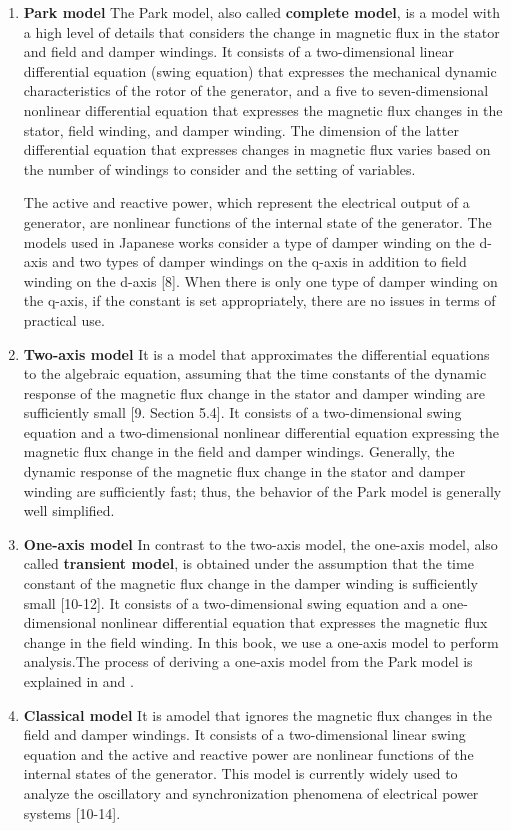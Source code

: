 \documentclass[graybox, envcountchap]{svmult}
\begin{document}
\smallskip
\begin{enumerate}[label=(\alph*)]
  \item \textbf{Park model} The Park model, also called \textbf{complete model},
  is a model with a high level of details that considers the change in magnetic
  flux in the stator and field and damper windings.  It consists of a
  two-dimensional linear differential equation (swing equation) that expresses
  the mechanical dynamic characteristics of the rotor of the generator, and a
  five to seven-dimensional nonlinear differential equation that expresses the
  magnetic flux changes in the stator, field winding, and damper winding.  The
  dimension of the latter differential equation that expresses changes in
  magnetic flux varies based on the number of windings to consider and the
  setting of variables. 

  The active and reactive power, which represent the electrical output of a
  generator, are nonlinear functions of the internal state of the generator. The
  models used in Japanese works consider a type of damper winding on the d-axis
  and two types of damper windings on the q-axis in addition to field winding on
  the d-axis [8].  When there is only one type of damper winding on the q-axis, if
  the constant is set appropriately, there are no issues in terms of practical
  use.
  \bigskip
  \item \textbf{Two-axis model} It is a model that approximates the differential
  equations to the algebraic equation, assuming that the time constants of the
  dynamic response of the magnetic flux change in the stator and damper winding
  are sufficiently small [9. Section 5.4]. It consists of a two-dimensional
  swing equation and a two-dimensional nonlinear differential equation
  expressing the magnetic flux change in the field and damper windings.
  Generally, the dynamic response of the magnetic flux change in the stator and
  damper winding are sufficiently fast; thus, the behavior of the Park model is
  generally well simplified.
  \bigskip
  \item \textbf{One-axis model} In contrast to the two-axis model, the one-axis
  model, also called \textbf{transient model}, is obtained under the assumption
  that the time constant of the magnetic flux change in the damper winding is
  sufficiently small [10-12]. It consists of a two-dimensional swing equation
  and a one-dimensional nonlinear differential equation that expresses the
  magnetic flux change in the field winding. In this book, we use a one-axis
  model to perform analysis.The process of deriving a one-axis model from the
  Park model is explained in \cite[Section 5]{sauer2017power} and \cite[Section
  4.15]{anderson2008power}.
  \bigskip
  \item \textbf{Classical model} It is amodel that ignores the magnetic flux
  changes in the field and damper windings. It consists of a two-dimensional
  linear swing equation and the active and reactive power are nonlinear
  functions of the internal states of the generator. This model is currently
  widely used to analyze the oscillatory and synchronization phenomena of
  electrical power systems [10-14].
\end{enumerate}
\end{document}
